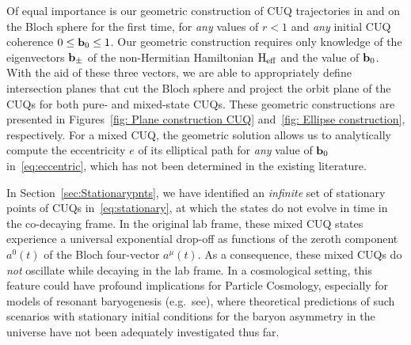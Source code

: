 \documentclass[12pt,a4paper]{article}
\begin{document}
Of equal importance is our geometric construction of CUQ trajectories in and on the Bloch sphere for the first time, for {\em any} values of $r<1$ and {\em any} initial CUQ coherence $0\le {\bf b}_0\le 1$. Our geometric construction requires only knowledge of the eigenvectors ${\bf b}_\pm$ of the non-Hermitian Hamiltonian $\text{H}_{\rm eff}$ and the value of ${\bf b}_0$. With the aid of these three vectors, we are able to appropriately define intersection planes that cut the Bloch sphere and project the orbit plane of the CUQs for both pure- and mixed-state CUQs. These geometric constructions are presented in Figures~\ref{fig: Plane construction CUQ} and~\ref{fig: Ellipse construction}, respectively. For a mixed CUQ, the geometric solution allows us to analytically compute the eccentricity $e$ of its elliptical path for {\em any} value of ${\bf b}_0$ in~\eqref{eq:eccentric}, which has not been determined in the existing literature. 

In Section~\ref{sec:Stationarypnts}, we have identified an {\em infinite} set of stationary points of CUQs in~\eqref{eq:stationary}, at which the states do not evolve in time in the co-decaying frame. In the original lab frame, these mixed CUQ states experience a universal exponential drop-off as functions of the zeroth component $a^0(t)$ of the Bloch four-vector $a^\mu(t)$. As a consequence, these mixed CUQs do {\em not} oscillate while decaying in the lab frame. In a cosmological setting, this feature could have profound implications for Particle Cosmology, especially for models of resonant baryogenesis (e.g.~see\cite{Karamitros:2023tqr}), where theoretical predictions of such scenarios with stationary initial conditions for the baryon asymmetry in the universe have not been adequately investigated thus far.
\end{document}
